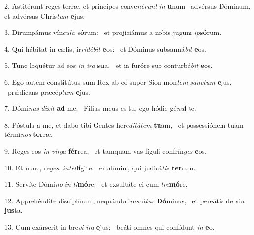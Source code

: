 2. Astitérunt reges terræ, et príncipes conve\textit{né}\textit{runt} \textit{in} \textbf{u}num \ast\  advérsus Dóminum, et advérsus Chris\textit{tum} \textbf{e}jus.\

3. Dirumpámus vín\textit{cu}\textit{la} \textit{e}\textbf{ó}rum: \ast\  et projiciámus a nobis jugum \textit{ip}\textbf{só}rum.\

4. Qui hábitat in cælis, ir\textit{ri}\textit{dé}\textit{bit} \textbf{e}os: \ast\  et Dóminus subsanná\textit{bit} \textbf{e}os.\

5. Tunc loquétur ad eos \textit{in} \textit{i}\textit{ra} \textbf{su}a, \ast\  et in furóre suo conturbá\textit{bit} \textbf{e}os.\

6. Ego autem constitútus sum Rex ab eo super Sion mon\textit{tem} \textit{sanc}\textit{tum} \textbf{e}jus, \ast\  prǽdicans præcép\textit{tum} \textbf{e}jus.\

7. Dómi\textit{nus} \textit{di}\textit{xit} \textbf{ad} me: \ast\  Fílius meus es tu, ego hódie gé\textit{nu}\textbf{i} te.\

8. Póstula a me, et dabo tibi Gentes here\textit{di}\textit{tá}\textit{tem} \textbf{tu}am, \ast\  et possessiónem tuam térmi\textit{nos} \textbf{ter}ræ.\

9. Reges eos \textit{in} \textit{vir}\textit{ga} \textbf{fér}rea, \ast\  et tamquam vas fíguli confrín\textit{ges} \textbf{e}os.\

10. Et nunc, re\textit{ges}, \textit{in}\textit{tel}\textbf{lí}gite: \ast\  erudímini, qui judicá\textit{tis} \textbf{ter}ram.\

11. Servíte Dómi\textit{no} \textit{in} \textit{ti}\textbf{mó}re: \ast\  et exsultáte ei cum \textit{tre}\textbf{mó}re.\

12. Apprehéndite disciplínam, nequándo i\textit{ras}\textit{cá}\textit{tur} \textbf{Dó}minus, \ast\  et pereátis de vi\textit{a} \textbf{jus}ta.\

13. Cum exárserit in bre\textit{vi} \textit{i}\textit{ra} \textbf{e}jus: \ast\  beáti omnes qui confídunt \textit{in} \textbf{e}o.\


